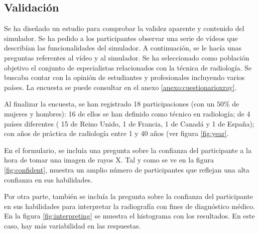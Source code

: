 
\subsection{Validación}

Se ha diseñado un estudio para comprobar la validez aparente y contenido del simulador. Se ha pedido a los participantes observar una serie de vídeos que describían las funcionalidades del simulador. A continuación, se le hacía unas preguntas referentes al vídeo y al simulador. Se ha seleccionado como  población objetivo el conjunto de especialistas relacionados con la técnica de radiología. Se buscaba contar con la opinión de estudiantes y profesionales incluyendo varios países. La encuesta se puede consultar en el anexo \ref{anexo:cuestionarioxray}.

Al finalizar la encuesta, se han registrado 18 participaciones (con un $50\%$ de mujeres y hombres): 16 de ellos se han definido como técnico en radiología; de 4 países diferentes ( 15 de Reino Unido, 1 de Francia, 1 de Canadá y 1 de España); con años de práctica de radiología entre 1 y 40 años (ver figura \ref{fig:year}.

En el formulario, se incluía una pregunta sobre la confianza del participante a la hora de tomar una imagen de rayos X. Tal y como se ve en la figura \ref{fig:confident}, muestra un amplio número de participantes que reflejan una alta confianza en sus habilidades.

Por otra parte, también se incluía la pregunta sobre la confianza del participante en sus habilidades para interpretar la radiografía con fines de diagnóstico médico. En la figura \ref{fig:interpreting} se muestra el histograma con los resultados. En este caso, hay más variabilidad en las respuestas.


